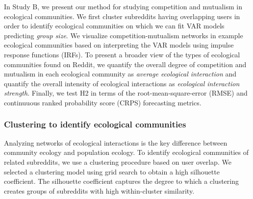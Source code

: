 \documentclass[letterpaper]{article}\usepackage[]{graphicx}\usepackage[]{color}
\begin{document}
In Study B, we present our method for studying competition and mutualism in ecological communities. 
We first cluster subreddits having overlapping users in order to identify ecological communities on which we can fit VAR models predicting \emph{group size}.
We visualize competition-mutualism networks in example ecological communities based on interpreting the VAR models using impulse response functions (IRFs).
To present a broader view of the types of ecological communities found on Reddit, we quantify the overall degree of competition and mutualism in each ecological community as \emph{average ecological interaction} and quantify the overall intensity of ecological interactions as \emph{ecological interaction strength}. 
Finally, we test H2 in terms of the root-mean-square-error (RMSE) and continuuous ranked probability score (CRPS) forecasting metrics. 



\subsubsection{Clustering to identify ecological communities}
\label{sec:clustering}
Analyzing networks of ecological interactions is the key difference between community ecology and population ecology. 
To identify ecological communities of related subreddits, we use a clustering procedure based on user overlap.
We selected a clustering model using grid search to obtain a high silhouette coefficient. The silhouette coefficient captures the degree to which a clustering creates groups of subreddits with high within-cluster similarity.
\end{document}
